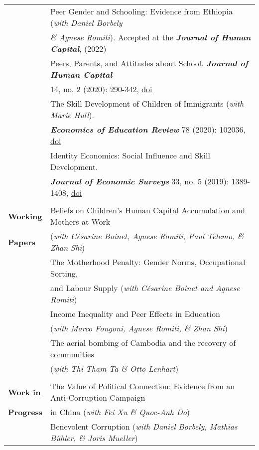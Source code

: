 \documentclass[11pt,a4paper]{article}
\begin{document}
\begin{longtable}{l l}
\addlinespace
																				&  Peer Gender and Schooling: Evidence from Ethiopia (\textit{with Daniel Borbely}    \\ 
																				&  \textit{\& Agnese Romiti}). Accepted at the \textbf{\textit{Journal of Human Capital}}, (2022)    \\ 
\addlinespace
																				&  Peers, Parents, and Attitudes about School. \textbf{\textit{Journal of Human Capital}}  \\
																				&  14, no. 2 (2020): 290-342, \href{https://doi.org/10.1086/709507}{doi}  \\   
\addlinespace						
																				&  The Skill Development of Children of Immigrants (\textit{with Marie Hull}).  \\ 
																				&  \textbf{\textit{Economics of Education Review}} 78 (2020): 102036, \href{https://doi.org/10.1016/j.econedurev.2020.102036}{doi}    \\			
\addlinespace
																				&  Identity Economics: Social Influence and Skill Development.     \\
																				&  \textbf{\textit{Journal of Economic Surveys}} 33, no. 5 (2019): 1389-1408, \href{ https://doi.org/10.1111/joes.12331}{doi}		\\			
																				&   \\
\textbf{Working} 							    			& Beliefs on Children's Human Capital Accumulation and Mothers at Work  \\
\textbf{Papers}													& (\textit{with C\'esarine Boinet, Agnese Romiti, Paul Telemo, \& Zhan Shi})  \\	
\addlinespace 
																				& The Motherhood Penalty: Gender Norms, Occupational Sorting,  \\
																				& and Labour Supply (\textit{with C\'esarine Boinet and Agnese Romiti})  \\ 
\addlinespace
																				&  Income Inequality and Peer Effects in Education  \\ 
																				&  (\textit{with Marco Fongoni, Agnese Romiti, \& Zhan Shi})   \\
\addlinespace
																				& The aerial bombing of Cambodia and the recovery of communities \\
																				& (\textit{with Thi Tham Ta \& Otto Lenhart})  \\											
																				&  \\
\textbf{Work in} 																& The Value of Political Connection: Evidence from an Anti-Corruption Campaign \\ 			
\textbf{Progress}																& in China (\textit{with Fei Xu \& Quoc-Anh Do})  \\				
\addlinespace
																				&  Benevolent Corruption (\textit{with Daniel Borbely, Mathias B{\"u}hler, \& Joris Mueller})   \\								


\end{longtable}
\end{document}
